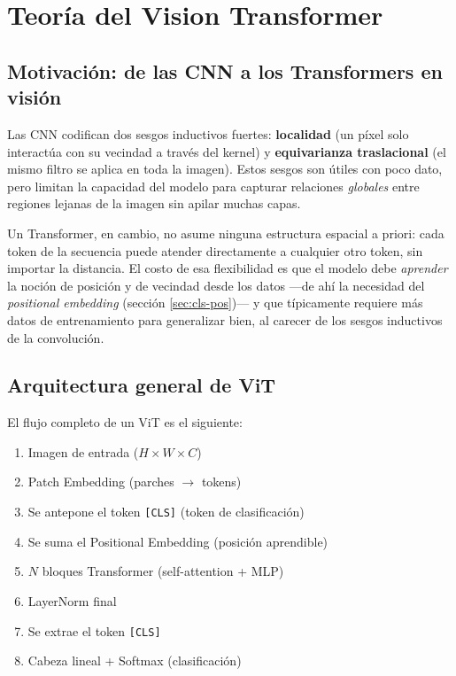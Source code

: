 \documentclass[11pt,a4paper]{article}
\begin{document}
\section{Teoría del Vision Transformer}

\subsection{Motivación: de las CNN a los Transformers en visión}

Las CNN codifican dos sesgos inductivos fuertes: \textbf{localidad} (un
píxel solo interactúa con su vecindad a través del kernel) y
\textbf{equivarianza traslacional} (el mismo filtro se aplica en toda la
imagen). Estos sesgos son útiles con poco dato, pero limitan la capacidad
del modelo para capturar relaciones \emph{globales} entre regiones lejanas
de la imagen sin apilar muchas capas.

Un Transformer, en cambio, no asume ninguna estructura espacial a priori:
cada token de la secuencia puede atender directamente a cualquier otro
token, sin importar la distancia. El costo de esa flexibilidad es que el
modelo debe \emph{aprender} la noción de posición y de vecindad desde los
datos ---de ahí la necesidad del \emph{positional embedding} (sección
\ref{sec:cls-pos})--- y que típicamente requiere más datos de entrenamiento
para generalizar bien, al carecer de los sesgos inductivos de la
convolución.

\subsection{Arquitectura general de ViT}

El flujo completo de un ViT es el siguiente:

\begin{enumerate}
  \item Imagen de entrada ($H \times W \times C$)
  \item Patch Embedding (parches $\rightarrow$ tokens)
  \item Se antepone el token \texttt{[CLS]} (token de clasificación)
  \item Se suma el Positional Embedding (posición aprendible)
  \item $N$ bloques Transformer (self-attention + MLP)
  \item LayerNorm final
  \item Se extrae el token \texttt{[CLS]}
  \item Cabeza lineal + Softmax (clasificación)
\end{enumerate}
\end{document}

